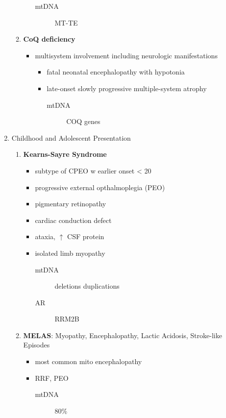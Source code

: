 \documentclass[12pt]{scrartcl}
\begin{document}
\begin{enumerate}
\begin{enumerate}
\begin{itemize}
\begin{description}
\item[{mtDNA}] MT-TE
\end{description}
\end{itemize}
\item \textbf{CoQ deficiency}
\label{sec:org4259c89}
\begin{itemize}
\item multisystem involvement including neurologic manifestations
\begin{itemize}
\item fatal neonatal encephalopathy with hypotonia
\item late-onset slowly progressive multiple-system atrophy
\begin{description}
\item[{mtDNA}] COQ genes
\end{description}
\end{itemize}
\end{itemize}
\end{enumerate}
\item Childhood and Adolescent Presentation
\label{sec:org06d0247}
\begin{enumerate}
\item \textbf{Kearns-Sayre Syndrome}
\label{sec:orgfec153f}
\begin{itemize}
\item subtype of CPEO w earlier onset \textless{} 20
\item progressive external opthalmoplegia (PEO)
\item pigmentary retinopathy
\item cardiac conduction defect
\item ataxia, \(\uparrow\) CSF protein
\item isolated limb myopathy
\begin{description}
\item[{mtDNA}] deletions \textpm{} duplications
\item[{AR}] RRM2B
\end{description}
\end{itemize}
\item \textbf{MELAS}: Myopathy, Encephalopathy, Lactic Acidosis, Stroke-like Episodes
\label{sec:orgfcdc505}
\begin{itemize}
\item most common mito encephalopathy
\item RRF, PEO
\begin{description}
\item[{mtDNA}] 80\%

\end{description}
\end{itemize}
\end{enumerate}
\end{enumerate}
\end{document}
